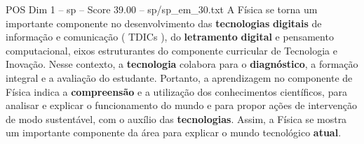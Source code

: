 \begin{textsample}{POS Dim 1 – sp – Score 39.00 – sp/sp\_em\_30.txt}
A Física se torna um importante componente no desenvolvimento das \textbf{tecnologias} \textbf{digitais} de informação e comunicação ( TDICs ), do \textbf{letramento} \textbf{digital} e pensamento computacional, eixos estruturantes do componente curricular de Tecnologia e Inovação.
Nesse contexto, a \textbf{tecnologia} colabora para o \textbf{diagnóstico}, a formação integral e a avaliação do estudante.
Portanto, a aprendizagem no componente de Física indica a \textbf{compreensão} e a utilização dos conhecimentos científicos, para analisar e explicar o funcionamento do mundo e para propor ações de intervenção de modo sustentável, com o auxílio das \textbf{tecnologias}.
Assim, a Física se mostra um importante componente da área para explicar o mundo tecnológico \textbf{atual}.

\end{textsample}
